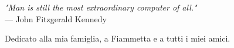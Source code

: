 
\cleardoublepage
{}
\thispagestyle{empty}

\vspace*{3cm}

\begin{center}
\textit{"Man is still the most extraordinary computer of all."} \\ \medskip
--- John Fitzgerald Kennedy
\end{center}

\medskip

\begin{center}
Dedicato alla mia famiglia, a Fiammetta e a tutti i miei amici.
\end{center}
